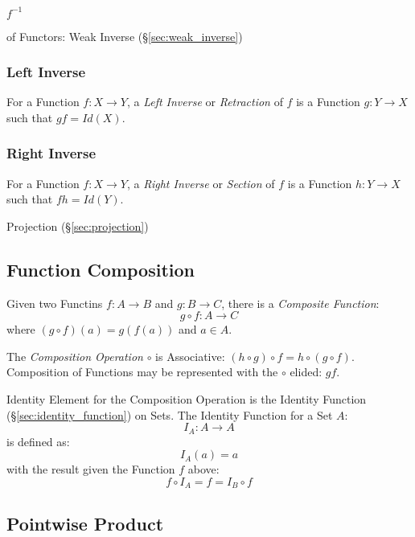 $f^{-1}$


of Functors: Weak Inverse (\S\ref{sec:weak_inverse})



\subsubsection{Left Inverse}\label{sec:left_inverse}

For a Function $f: X \to Y$, a \emph{Left Inverse} or
\emph{Retraction} of $f$ is a Function $g: Y \to X$ such that
$gf = Id(X)$.



\subsubsection{Right Inverse}\label{sec:right_inverse}

For a Function $f: X \to Y$, a \emph{Right Inverse} or
\emph{Section} of $f$ is a Function $h: Y \to X$ such that $fh
= Id(Y)$.

Projection (\S\ref{sec:projection})



\subsection{Function Composition}\label{sec:function_composition}

Given two Functins $f : A \to B$ and $g : B \to C$,
there is a \emph{Composite Function}:
\[
  g \circ f : A \to C
\]
where $(g \circ f)(a) = g(f(a))$ and $a \in A$.

The \emph{Composition Operation} $\circ$ is Associative: $(h \circ g)
\circ f = h \circ (g \circ f)$. Composition of Functions may be
represented with the $\circ$ elided: $gf$.

Identity Element for the Composition Operation is the Identity
Function (\S\ref{sec:identity_function}) on Sets. The Identity
Function for a Set $A$:
\[
  I_A : A \to A
\]
is defined as:
\[
  I_A(a) = a
\]
with the result given the Function $f$ above:
\[
  f \circ I_A = f = I_B \circ f
\]



\subsection{Pointwise Product}\label{sec:pointwise_product}

